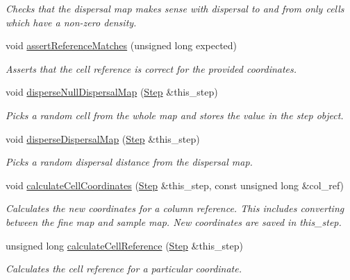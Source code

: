 \begin{DoxyCompactItemize}
\begin{DoxyCompactList}\small\item\em Checks that the dispersal map makes sense with dispersal to and from only cells which have a non-\/zero density. \end{DoxyCompactList}\item 
void \hyperlink{class_dispersal_coordinator_a210c821cc36e08829fbfbfe640a5ccb2}{assert\+Reference\+Matches} (unsigned long expected)
\begin{DoxyCompactList}\small\item\em Asserts that the cell reference is correct for the provided coordinates. \end{DoxyCompactList}\item 
void \hyperlink{class_dispersal_coordinator_a4bac3aeedb3ceb40601c3db951032d0e}{disperse\+Null\+Dispersal\+Map} (\hyperlink{struct_step}{Step} \&this\+\_\+step)
\begin{DoxyCompactList}\small\item\em Picks a random cell from the whole map and stores the value in the step object. \end{DoxyCompactList}\item 
void \hyperlink{class_dispersal_coordinator_a6605069356e02d1c130b6d68e5d08483}{disperse\+Dispersal\+Map} (\hyperlink{struct_step}{Step} \&this\+\_\+step)
\begin{DoxyCompactList}\small\item\em Picks a random dispersal distance from the dispersal map. \end{DoxyCompactList}\item 
void \hyperlink{class_dispersal_coordinator_af2a3792c5e0bea86fa044c4cd3e5146c}{calculate\+Cell\+Coordinates} (\hyperlink{struct_step}{Step} \&this\+\_\+step, const unsigned long \&col\+\_\+ref)
\begin{DoxyCompactList}\small\item\em Calculates the new coordinates for a column reference. This includes converting between the fine map and sample map. New coordinates are saved in this\+\_\+step. \end{DoxyCompactList}\item 
unsigned long \hyperlink{class_dispersal_coordinator_a737c7f1a06650b467d06a91c0474fb79}{calculate\+Cell\+Reference} (\hyperlink{struct_step}{Step} \&this\+\_\+step)
\begin{DoxyCompactList}\small\item\em Calculates the cell reference for a particular coordinate. \end{DoxyCompactList}\item 

\end{DoxyCompactItemize}
